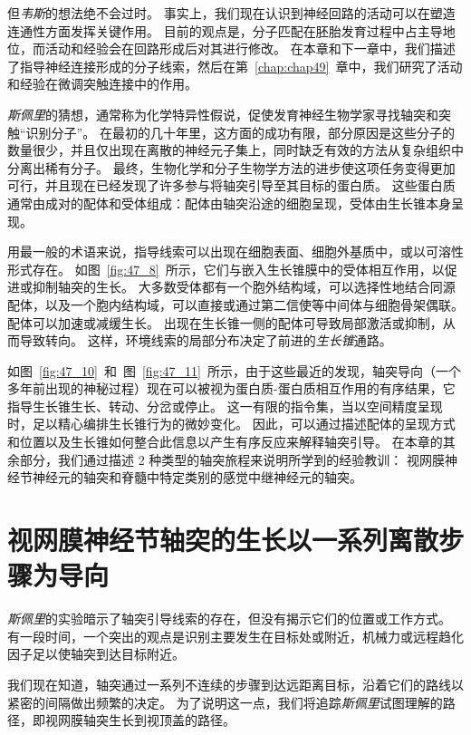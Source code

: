 但\textit{韦斯}的想法绝不会过时。
事实上，我们现在认识到神经回路的活动可以在塑造连通性方面发挥关键作用。
目前的观点是，分子匹配在胚胎发育过程中占主导地位，而活动和经验会在回路形成后对其进行修改。
在本章和下一章中，我们描述了指导神经连接形成的分子线索，然后在第~\ref{chap:chap49}~章中，我们研究了活动和经验在微调突触连接中的作用。


\textit{斯佩里}的猜想，通常称为化学特异性假说，促使发育神经生物学家寻找轴突和突触“识别分子”。
在最初的几十年里，这方面的成功有限，部分原因是这些分子的数量很少，并且仅出现在离散的神经元子集上，同时缺乏有效的方法从复杂组织中分离出稀有分子。
最终，生物化学和分子生物学方法的进步使这项任务变得更加可行，并且现在已经发现了许多参与将轴突引导至其目标的蛋白质。
这些蛋白质通常由成对的配体和受体组成：配体由轴突沿途的细胞呈现，受体由生长锥本身呈现。


用最一般的术语来说，指导线索可以出现在细胞表面、细胞外基质中，或以可溶性形式存在。
如图~\ref{fig:47_8}~所示，它们与嵌入生长锥膜中的受体相互作用，以促进或抑制轴突的生长。
大多数受体都有一个胞外结构域，可以选择性地结合同源配体，以及一个胞内结构域，可以直接或通过第二信使等中间体与细胞骨架偶联。
配体可以加速或减缓生长。
出现在生长锥一侧的配体可导致局部激活或抑制，从而导致转向。
这样，环境线索的局部分布决定了前进的\textit{生长锥}通路。


如图~\ref{fig:47_10}~和~图~\ref{fig:47_11}~所示，由于这些最近的发现，轴突导向（一个多年前出现的神秘过程）现在可以被视为蛋白质-蛋白质相互作用的有序结果，它指导生长锥生长、转动、分岔或停止。
这一有限的指令集，当以空间精度呈现时，足以精心编排生长锥行为的微妙变化。
因此，可以通过描述配体的呈现方式和位置以及生长锥如何整合此信息以产生有序反应来解释轴突引导。
在本章的其余部分，我们通过描述 2 种类型的轴突旅程来说明所学到的经验教训：
视网膜神经节神经元的轴突和脊髓中特定类别的感觉中继神经元的轴突。



\section{视网膜神经节轴突的生长以一系列离散步骤为导向}

\textit{斯佩里}的实验暗示了轴突引导线索的存在，但没有揭示它们的位置或工作方式。
有一段时间，一个突出的观点是识别主要发生在目标处或附近，机械力或远程趋化因子足以使轴突到达目标附近。


我们现在知道，轴突通过一系列不连续的步骤到达远距离目标，沿着它们的路线以紧密的间隔做出频繁的决定。
为了说明这一点，我们将追踪\textit{斯佩里}试图理解的路径，即视网膜轴突生长到视顶盖的路径。



